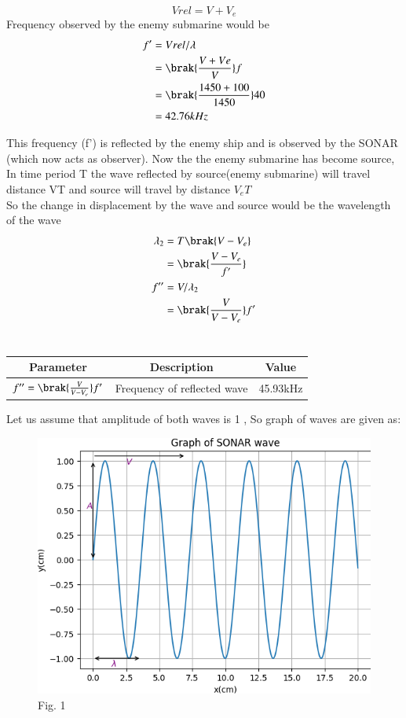 \documentclass[journal,12pt,onecolumn]{IEEEtran}
\theoremstyle{remark}
\begin{document}
\begin{equation}
Vrel=V+V_e
\end{equation}
Frequency observed by the enemy submarine would be
\begin{align}
f'&=Vrel/\lambda\\
&=\brak{\frac{V+Ve}{V}}f\\
&= \brak{\frac{1450+100}{1450}}40\\
&=42.76kHz
\end{align}

This frequency (f') is reflected by the enemy ship and is observed by the SONAR (which now acts as observer).
Now the the enemy submarine has become source,\\
In time period T the wave reflected by source(enemy submarine) will travel distance VT and source will travel by distance $V_eT$\\
So the change in displacement by the wave and source would be the wavelength of the wave
\begin{align}
\lambda_2&=T\brak{V-V_e}\\
&=\brak{\frac{V-V_e}{f'}}\\
f''&=V/\lambda_2\\
&=\brak{\frac{V}{V-V_e}}f'
\end{align}
\\
\begin{tabular}{|c|c|c|}
   \hline
   Parameter & Description & Value\\
   \hline
   $f''= \brak{\frac{V}{V-V_e}}f'$& Frequency of reflected wave & 45.93kHz\\
   \hline
   
\end{tabular}
\newpage
Let us assume that amplitude of both waves is 1 , So graph of waves are given as: 

\begin{figure}[h]
   
    \includegraphics[width=120mm]{figs/fig1.png}\\
     \centering
    {Fig. 1}
  
\end{figure}
\end{document}
